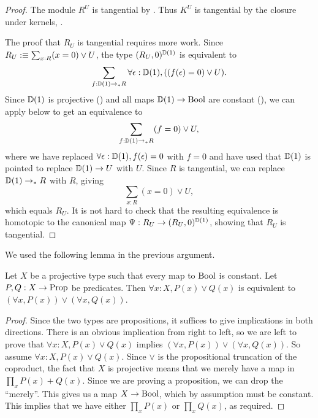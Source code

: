 \begin{proof}
The module $R^U$ is tangential by .
Thus $K^U$ is tangential by the closure under kernels, .

The proof that $R_U$ is tangential requires more work.
Since $R_U :\equiv \sum_{x : R} (x = 0) \lor U$,
the type $(R_U,0)^{\mathbb{D}(1)}$ is equivalent to
\[
  \sum_{f : \mathbb{D}(1) \to_{\ast} R} \forall \epsilon : \mathbb{D}(1), ((f(\epsilon) = 0) \lor U) .
\]
Since $\mathbb{D}(1)$ is projective () and all maps $\mathbb{D}(1) \to \mathrm{Bool}$
are constant (\cite[Proposition 1.3.4]{diffgeo-article}),
we can apply  below to
get an equivalence to
\[
  \sum_{f : \mathbb{D}(1) \to_{\ast} R} (f = 0) \lor U ,
\]
where we have replaced $\forall \epsilon : \mathbb{D}(1), f(\epsilon) = 0$ with $f = 0$
and have used that $\mathbb{D}(1)$ is pointed to replace $\mathbb{D}(1) \to U$ with $U$.
Since $R$ is tangential, we can replace $\mathbb{D}(1) \to_{\ast} R$ with $R$, giving
\[
  \sum_{x : R} (x = 0) \lor U ,
\]
which equals $R_U$.
It is not hard to check that the resulting equivalence is homotopic to the canonical map $\Psi : R_U \to (R_U,0)^{\mathbb{D}(1)}$, showing that $R_U$ is tangential.
\end{proof}

We used the following lemma in the previous argument.

\begin{lemma}\label{lem:forall-distributes-over-or}
Let $X$ be a projective type such that every map to $\mathrm{Bool}$ is constant.
Let $P, Q : X \to \mathrm{Prop}$ be predicates.
Then $\forall x : X, P(x) \lor Q(x)$ is equivalent to $(\forall x, P(x)) \lor (\forall x, Q(x))$.
\end{lemma}

\begin{proof}
Since the two types are propositions, it suffices to give implications in both directions.
There is an obvious implication from right to left, so we are left to prove that
$\forall x : X, P(x) \lor Q(x)$ implies $(\forall x, P(x)) \lor (\forall x, Q(x))$.
So assume $\forall x : X, P(x) \lor Q(x)$.
Since $\lor$ is the propositional truncation of the coproduct, the fact that $X$ is projective
means that we merely have a map in $\prod_x P(x) + Q(x)$.
Since we are proving a proposition, we can drop the ``merely''.
This gives us a map $X \to \mathrm{Bool}$, which by assumption must be constant.
This implies that we have either $\prod_x P(x)$ or $\prod_x Q(x)$, as required.
\end{proof}

